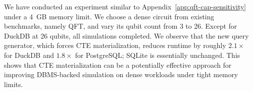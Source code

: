 \medskip
{}
We have conducted an experiment similar to Appendix~\ref{app:qft-cap-sensitivity} under a
4~GB memory limit. We choose a dense circuit from existing benchmarks, namely QFT, and vary
its qubit count from 3 to 26. Except for DuckDB at 26 qubits, all simulations completed.
We observe that the new query generator, which forces CTE materialization, reduces runtime
by roughly $2.1\times$ for DuckDB and $1.8\times$ for PostgreSQL; SQLite is essentially
unchanged. This shows that CTE materialization can be a potentially effective approach
for improving DBMS-backed simulation on dense workloads under tight memory limits.



